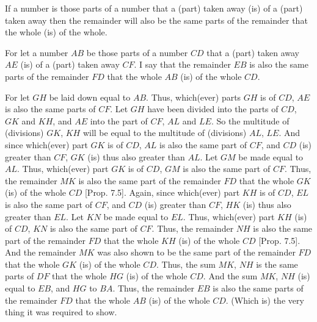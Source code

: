 \begin{Parallel}{}{}
{If  a number is those parts of a number that a
(part) taken away (is) of a (part) taken away then the remainder will also be
the same parts of the remainder that the whole (is) of the whole.

\epsfysize=1.4in
\centerline{}

For let a number $AB$ be those parts of a number $CD$ that a
(part) taken away $AE$ (is) of a (part) taken away $CF$. I say that the remainder
$EB$ is also the same parts of the remainder $FD$ that the whole $AB$ (is) of the
whole $CD$.

For let $GH$ be laid down equal to $AB$. Thus, which(ever) parts $GH$ is of $CD$,
$AE$ is also the same parts of $CF$. Let $GH$ have been divided into the parts
of $CD$, $GK$ and $KH$, and $AE$ into the part of $CF$, $AL$ and $LE$. So the
multitude of (divisions) $GK$, $KH$ will be equal to the multitude of (divisions)
$AL$, $LE$. And since which(ever) part $GK$ is of $CD$, $AL$ is also the same part 
of $CF$, and $CD$ (is) greater than $CF$,  $GK$ (is) thus also greater than $AL$.
Let $GM$ be made equal to $AL$. Thus, which(ever) part $GK$ is of $CD$, $GM$ is also the same part of $CF$. Thus, the remainder $MK$ is also the same part of the
remainder $FD$ that  the whole $GK$ (is) of the whole $CD$ [Prop. 7.5]. Again, since
which(ever) part $KH$ is of $CD$, $EL$ is also the same part of $CF$, and
$CD$ (is) greater than $CF$, $HK$ (is) thus also greater than $EL$. Let $KN$ be
made equal to $EL$. Thus, which(ever) part $KH$ (is) of $CD$, $KN$ is also the
same part of $CF$. Thus, the remainder $NH$ is also the same part 
of the remainder $FD$ that the whole $KH$ (is) of the whole $CD$  [Prop. 7.5]. And the remainder $MK$
was also shown to be the same part of the remainder $FD$ that the whole
$GK$ (is) of the whole $CD$. Thus, the sum $MK$, $NH$ is the same parts of
$DF$ that the whole $HG$ (is) of the whole $CD$. And the sum $MK$, $NH$
(is) equal to $EB$, and $HG$ to $BA$. Thus, the remainder $EB$ is also
the same parts of the remainder $FD$ that the whole $AB$ (is)
of the whole $CD$. (Which is) the very thing it was required to show.}
\end{Parallel}


\vspace{7pt}{\footnotesize\noindent$^\dag$ In modern notation, this
proposition states that if $a=(m/n)\,b$ and $c=(m/n)\,d$ then $(a-c)=
(m/n)\,(b-d)$, where all symbols denote numbers.}

